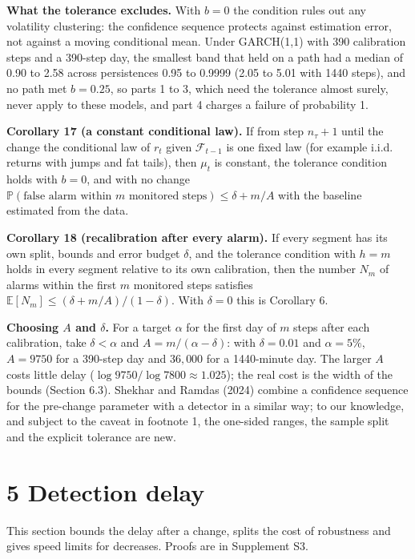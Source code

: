\documentclass[
]{article}
\begin{document}
\textbf{What the tolerance excludes.} With \(b = 0\) the condition rules
out any volatility clustering: the confidence sequence protects against
estimation error, not against a moving conditional mean. Under
GARCH(1,1) with 390 calibration steps and a 390-step day, the smallest
band that held on a path had a median of 0.90 to 2.58 across
persistences 0.95 to 0.9999 (2.05 to 5.01 with 1440 steps), and no path
met \(b = 0.25\), so parts 1 to 3, which need the tolerance almost
surely, never apply to these models, and part 4 charges a failure of
probability 1.

\textbf{Corollary 17 (a constant conditional law).} If from step
\(n_\tau + 1\) until the change the conditional law of \(r_t\) given
\(\mathcal{F}_{t-1}\) is one fixed law (for example i.i.d. returns with
jumps and fat tails), then \(\mu_t\) is constant, the tolerance
condition holds with \(b = 0\), and with no change
\(\mathbb{P}(\text{false alarm within } m \text{ monitored steps}) \le \delta + m/A\)
with the baseline estimated from the data.

\textbf{Corollary 18 (recalibration after every alarm).} If every
segment has its own split, bounds and error budget \(\delta\), and the
tolerance condition with \(h = m\) holds in every segment relative to
its own calibration, then the number \(N_m\) of alarms within the first
\(m\) monitored steps satisfies
\(\mathbb{E}[N_m] \le (\delta + m/A)/(1-\delta)\). With \(\delta = 0\)
this is Corollary 6.

\textbf{Choosing \(A\) and \(\delta\).} For a target \(\alpha\) for the
first day of \(m\) steps after each calibration, take
\(\delta < \alpha\) and \(A = m/(\alpha - \delta)\): with
\(\delta = 0.01\) and \(\alpha = 5\%\), \(A = 9750\) for a 390-step day
and \(36{,}000\) for a 1440-minute day. The larger \(A\) costs little
delay (\(\log 9750/\log 7800 \approx 1.025\)); the real cost is the
width of the bounds (Section 6.3). Shekhar and Ramdas (2024) combine a
confidence sequence for the pre-change parameter with a detector in a
similar way; to our knowledge, and subject to the caveat in footnote 1,
the one-sided ranges, the sample split and the explicit tolerance are
new.

\hypertarget{detection-delay}{%
\section{5 Detection delay}\label{detection-delay}}

This section bounds the delay after a change, splits the cost of
robustness and gives speed limits for decreases. Proofs are in
Supplement S3.
\end{document}
